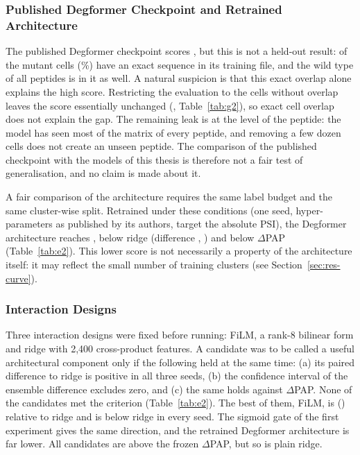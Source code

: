 \subsubsection{Published Degformer Checkpoint and Retrained Architecture}\label{sec:res-degformer}
The published Degformer checkpoint scores \nAucDegOfficial{}, but this is not a held-out result: \nOverlapCells{} of the
\nNCellsEOne{} mutant cells (\nOverlapPct\%) have an exact sequence in its training file, and the wild type of
all \nNPep{} peptides is in it as well. A natural suspicion is that this exact overlap alone explains the high score.
Restricting the evaluation to the \nNonOverlapCells{} cells without overlap leaves the score essentially unchanged
(\nAucDegNonOverlap{}, Table~\ref{tab:g2}), so exact cell overlap does not explain the gap. The remaining leak is at
the level of the peptide: the model has seen most of the matrix of every peptide, and removing a few dozen cells does
not create an unseen peptide. The comparison of the published checkpoint with the models of this thesis is
therefore not a fair test of generalisation, and no claim is made about it.

A fair comparison of the architecture requires the same label budget and the same cluster-wise split. Retrained
under these conditions (one seed, hyper-parameters as published by its authors, target the absolute PSI),
the Degformer architecture reaches \nAucDegArch{}, below ridge (difference \nDDegArchRidge{}, \nCIDegArchRidge{}) and below
$\Delta$PAP (Table~\ref{tab:e2}). This lower score is not necessarily a property of the architecture
itself: it may reflect the small number of training clusters (see Section~\ref{sec:res-curve}).

\subsubsection{Interaction Designs}\label{sec:res-interaction}
Three interaction designs were fixed before running: FiLM, a rank-8 bilinear form and ridge with 2,400
cross-product features. A candidate was to be called a useful architectural component only if the following
held at the same time: (a) its paired difference to ridge is positive in all three seeds, (b) the confidence
interval of the ensemble difference excludes zero, and (c) the same holds against $\Delta$PAP. None of the
candidates met the criterion (Table~\ref{tab:e2}). The best of them, FiLM, is \nDFilmRidge{} (\nCIFilmRidge{})
relative to ridge and is below ridge in every seed. The sigmoid gate of the first experiment gives the same
direction, and the retrained Degformer architecture is far lower. All candidates are above the frozen
$\Delta$PAP, but so is plain ridge.

